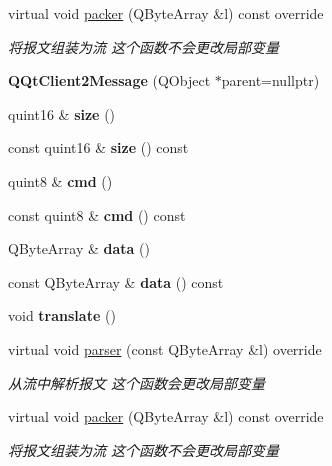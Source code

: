 \begin{DoxyCompactItemize}
virtual void \mbox{\hyperlink{class_q_qt_client2_message_a64b7eaf964f8f2a2ef2c10088fb7e60a}{packer}} (Q\+Byte\+Array \&l) const override
\begin{DoxyCompactList}\small\item\em 将报文组装为流 这个函数不会更改局部变量 \end{DoxyCompactList}\item 
\mbox{\label{class_q_qt_client2_message_adf070c6293b46521676c49bb739a84cc}} 
{\bfseries Q\+Qt\+Client2\+Message} (Q\+Object $\ast$parent=nullptr)
\item 
\mbox{\label{class_q_qt_client2_message_a97aab72f39c8ef7dd769c6288ae10560}} 
quint16 \& {\bfseries size} ()
\item 
\mbox{\label{class_q_qt_client2_message_a35e7cb82ed8f229c3e6feebba5d090f6}} 
const quint16 \& {\bfseries size} () const
\item 
\mbox{\label{class_q_qt_client2_message_a76c6980d32449dd5fa533b3cb8795be2}} 
quint8 \& {\bfseries cmd} ()
\item 
\mbox{\label{class_q_qt_client2_message_aaa7d3593e47bf5c2dc73ee2191b2dae1}} 
const quint8 \& {\bfseries cmd} () const
\item 
\mbox{\label{class_q_qt_client2_message_aba747c8696410cf6bea566bb3ad06c8c}} 
Q\+Byte\+Array \& {\bfseries data} ()
\item 
\mbox{\label{class_q_qt_client2_message_ab72e6dd3162159c91865917146c8f179}} 
const Q\+Byte\+Array \& {\bfseries data} () const
\item 
\mbox{\label{class_q_qt_client2_message_a95af1f1a9fa69a3bbabc0b8228d1b1f1}} 
void {\bfseries translate} ()
\item 
virtual void \mbox{\hyperlink{class_q_qt_client2_message_a62ecd0dc6ff91e806dcbfbe48ca39ac8}{parser}} (const Q\+Byte\+Array \&l) override
\begin{DoxyCompactList}\small\item\em 从流中解析报文 这个函数会更改局部变量 \end{DoxyCompactList}\item 
virtual void \mbox{\hyperlink{class_q_qt_client2_message_a64b7eaf964f8f2a2ef2c10088fb7e60a}{packer}} (Q\+Byte\+Array \&l) const override
\begin{DoxyCompactList}\small\item\em 将报文组装为流 这个函数不会更改局部变量 \end{DoxyCompactList}\end{DoxyCompactItemize}



